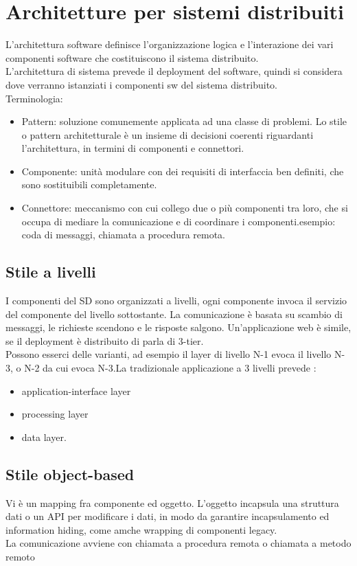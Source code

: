 \documentclass[16px]{article}
\begin{document}
\section{Architetture per sistemi distribuiti}
L'architettura software definisce l'organizzazione logica e l'interazione dei vari componenti software che costituiscono il sistema distribuito. \\L'architettura di sistema prevede il deployment del software, quindi si considera dove verranno istanziati i componenti sw del sistema distribuito.\\ Terminologia:
\begin{itemize}
\item Pattern: soluzione comunemente applicata ad una classe di problemi. Lo stile o pattern architetturale è un insieme di decisioni coerenti riguardanti l'architettura, in termini di componenti e connettori.
\item Componente: unità modulare con dei requisiti di interfaccia ben definiti, che sono sostituibili completamente.
\item Connettore: meccanismo con cui collego due o più componenti tra loro, che si occupa di mediare la comunicazione e di coordinare i componenti.esempio: coda di messaggi, chiamata a procedura remota.
\end{itemize}
\subsection{Stile a livelli}
I componenti del SD sono organizzati a livelli, ogni componente invoca il servizio del componente del livello sottostante. La comunicazione è basata su scambio di messaggi, le richieste scendono e le risposte salgono. Un'applicazione web è simile, se il deployment è distribuito di parla di 3-tier.\\ Possono esserci delle varianti, ad esempio il layer di livello N-1 evoca il livello N-3, o N-2
da cui evoca N-3.La tradizionale applicazione a 3 livelli prevede :
\begin{itemize}
\item application-interface layer
\item processing layer
\item data layer.
\end{itemize}
\subsection{Stile object-based}
Vi è un mapping fra componente ed oggetto. L'oggetto incapsula una struttura dati o un API per modificare i dati, in modo da garantire incapsulamento ed information hiding, come amche wrapping di componenti legacy.\\ La comunicazione avviene con chiamata a procedura remota o chiamata a metodo remoto
\end{document}
